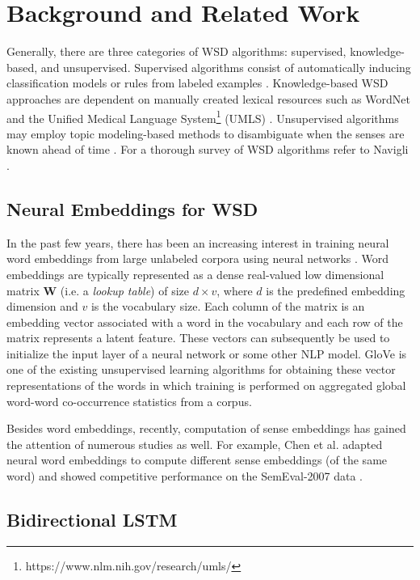 \documentclass{llncs}
\begin{document}
\section{Background and Related Work}
Generally, there are three categories of WSD algorithms: supervised, knowledge-based, and unsupervised. Supervised algorithms consist of automatically inducing classification models or rules from labeled examples \cite{zhong2010makes}. Knowledge-based WSD approaches are dependent on manually created lexical resources such as WordNet \cite{miller1995wordnet} and the Unified Medical Language System\footnote{https://www.nlm.nih.gov/research/umls/} (UMLS) \cite{pesaranghader2014word}. Unsupervised algorithms may employ topic modeling-based methods to disambiguate when the senses are known ahead of time \cite{kim2015link}. For a thorough survey of WSD algorithms refer to Navigli \cite{navigli2009word}.

\subsection{Neural Embeddings for WSD}
In the past few years, there has been an increasing interest in training neural word embeddings from large unlabeled corpora using neural networks \cite{collobert2008unified}\cite{mikolov2013efficient}. Word embeddings are typically represented as a dense real-valued low dimensional matrix $\boldsymbol{W}$ (i.e. a \textit{lookup table}) of size $d\times v$, where $d$ is the predefined embedding dimension and $v$ is the vocabulary size. Each column of the matrix is an embedding vector associated with a word in the vocabulary and each row of the matrix represents a latent feature. These vectors can subsequently be used to initialize the input layer of a neural network or some other NLP model. GloVe \cite{pennington2014glove} is one of the existing unsupervised learning algorithms for obtaining these vector representations of the words in which training is performed on aggregated global word-word co-occurrence statistics from a corpus.

Besides word embeddings, recently, computation of sense embeddings has gained the attention of numerous studies as well. For example, Chen et al. \cite{chen2014unified} adapted neural word embeddings to compute different sense embeddings (of the same word) and showed competitive performance on the SemEval-2007 data \cite{navigli2007semeval}.

\subsection{Bidirectional LSTM}
\end{document}
